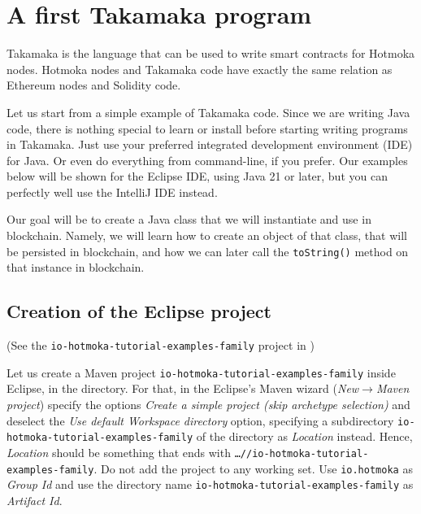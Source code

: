 \chapter{A first Takamaka program}\label{ch:a_first_takamaka_program}

Takamaka is the language that can be used to write
smart contracts for Hotmoka nodes. Hotmoka
nodes and Takamaka code have exactly the same
relation as Ethereum nodes and Solidity code.

Let us start from a simple example of Takamaka code. Since we are
writing Java code, there is nothing special to learn or install
before starting writing programs in Takamaka. Just use your
preferred integrated development environment (IDE) for Java. Or even
do everything from command-line, if you prefer. Our examples below will be
shown for the Eclipse IDE, using Java 21 or later, but you can perfectly well
use the IntelliJ IDE instead.

Our goal will be to create a Java class that we will instantiate
and use in blockchain. Namely, we will learn how to create an object
of that class, that will be persisted in blockchain, and how we can later
call the \texttt{toString()} method on that instance in blockchain.

\section{Creation of the Eclipse project}\label{sec:creation_first_eclipse_project}

\begin{center}
(See the \texttt{io-hotmoka-tutorial-examples-family} project in \hotmokaRepo{})
\end{center}

Let us create a Maven project \texttt{io-hotmoka-tutorial-examples-family} inside Eclipse,
in the \texttt{\hotmokaTutorialDir} directory.
For that, in the Eclipse's Maven wizard
(\emph{New}$\rightarrow$\emph{Maven project}) specify the options
\emph{Create a simple project (skip archetype selection)}
and deselect the \emph{Use default Workspace directory} option,
specifying a subdirectory \texttt{io-hotmoka-tutorial-examples-family}
of the \texttt{\hotmokaTutorialDir{}} directory as \emph{Location} instead.
Hence, \emph{Location} should be something that ends
with \texttt{\ldots/\hotmokaTutorialDir{}/io-hotmoka-tutorial-examples-family}.
Do not add the project to any working set. Use \texttt{io.hotmoka}
as \emph{Group Id} and use the directory name
\texttt{io-hotmoka-tutorial-examples-family} as \emph{Artifact Id}.

